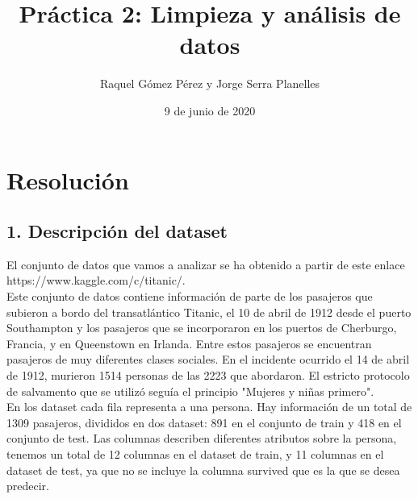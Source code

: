 \documentclass[12pt]{article}
\title{Práctica 2: Limpieza y análisis de datos}
\author{Raquel Gómez Pérez y Jorge Serra Planelles}
\date{9 de junio de 2020}
\begin{document}
\maketitle

\hypertarget{resolucion}{%
\section{Resolución}\label{resolucion}}

\hypertarget{descripcion}{%
\subsection{1. Descripción del dataset}\label{descripcion}}

El conjunto de datos que vamos a analizar se ha obtenido a partir de este enlace https://www.kaggle.com/c/titanic/.\\ Este conjunto de datos contiene información de parte de los pasajeros que subieron a bordo del transatlántico Titanic, el 10 de abril de 1912 desde el puerto Southampton y los pasajeros que se incorporaron en los puertos de Cherburgo, Francia, y en Queenstown en Irlanda. Entre estos pasajeros se encuentran pasajeros de muy diferentes clases sociales. En el incidente ocurrido el 14 de abril de 1912, murieron 1514 personas de las 2223 que abordaron. El estricto protocolo de salvamento que se utilizó seguía el principio "Mujeres y niñas primero".\\
En los dataset cada fila representa a una persona. Hay información de un total de 1309 pasajeros, divididos en dos dataset: 891 en el conjunto de train y 418 en el conjunto de test. Las columnas describen diferentes atributos sobre la persona, tenemos un total de 12 columnas en el dataset de train, y 11 columnas en el dataset de test, ya que no se incluye la columna survived que es la que se desea predecir.
\end{document}
